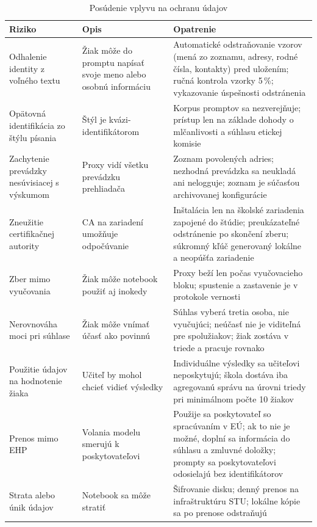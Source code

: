 \begin{table}[H]
\centering
\caption{Posúdenie vplyvu na ochranu údajov}
\label{tab:dpia}
\scriptsize
\begin{tabularx}{\textwidth}{@{}l X X@{}}
\toprule
\textbf{Riziko} & \textbf{Opis} & \textbf{Opatrenie} \\
\midrule
Odhalenie identity z voľného textu & Žiak môže do promptu napísať svoje meno alebo osobnú informáciu & Automatické odstraňovanie vzorov (mená zo zoznamu, adresy, rodné čísla, kontakty) pred uložením; ručná kontrola vzorky 5\,\%; vykazovanie úspešnosti odstránenia \\
Opätovná identifikácia zo štýlu písania & Štýl je kvázi-identifikátorom & Korpus promptov sa nezverejňuje; prístup len na základe dohody o mlčanlivosti a súhlasu etickej komisie \\
Zachytenie prevádzky nesúvisiacej s výskumom & Proxy vidí všetku prevádzku prehliadača & Zoznam povolených adries; nezhodná prevádzka sa neukladá ani nelogguje; zoznam je súčasťou archivovanej konfigurácie \\
Zneužitie certifikačnej autority & CA na zariadení umožňuje odpočúvanie & Inštalácia len na školské zariadenia zapojené do štúdie; preukázateľné odstránenie po skončení zberu; súkromný kľúč generovaný lokálne a neopúšťa zariadenie \\
Zber mimo vyučovania & Žiak môže notebook použiť aj inokedy & Proxy beží len počas vyučovacieho bloku; spustenie a zastavenie je v protokole vernosti \\
Nerovnováha moci pri súhlase & Žiak môže vnímať účasť ako povinnú & Súhlas vyberá tretia osoba, nie vyučujúci; neúčasť nie je viditeľná pre spolužiakov; žiak zostáva v triede a pracuje rovnako \\
Použitie údajov na hodnotenie žiaka & Učiteľ by mohol chcieť vidieť výsledky & Individuálne výsledky sa učiteľovi neposkytujú; škola dostáva iba agregovanú správu na úrovni triedy pri minimálnom počte 10 žiakov \\
Prenos mimo EHP & Volania modelu smerujú k poskytovateľovi & Použije sa poskytovateľ so spracúvaním v EÚ; ak to nie je možné, doplní sa informácia do súhlasu a zmluvné doložky; prompty sa poskytovateľovi odosielajú bez identifikátorov \\
Strata alebo únik údajov & Notebook sa môže stratiť & Šifrovanie disku; denný prenos na infraštruktúru STU; lokálne kópie sa po prenose odstraňujú \\
\bottomrule
\end{tabularx}
\end{table}

